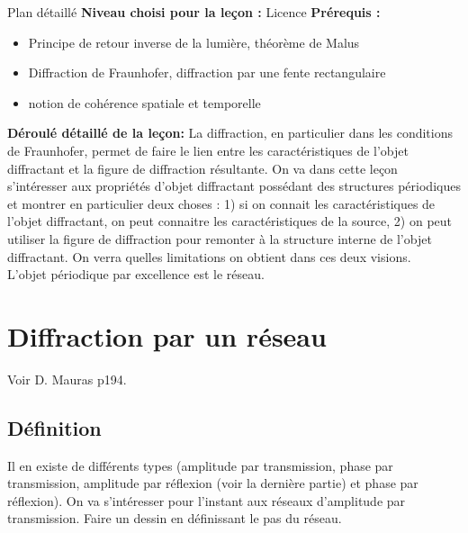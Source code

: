 \begin{reportBlock}{Plan détaillé}
  \textbf{Niveau choisi pour la leçon :} Licence
  \newline
  \textbf{Prérequis : }
  \begin{itemize}
      \item Principe de retour inverse de la lumière, théorème de Malus
      \item Diffraction de Fraunhofer, diffraction par une fente rectangulaire
      \item notion de cohérence spatiale et temporelle
  \end{itemize} 

  
  \textbf{Déroulé détaillé de la leçon: }   \newline
La diffraction, en particulier dans les conditions de  Fraunhofer, permet de faire le lien entre les caractéristiques de l’objet diffractant et la figure de diffraction résultante. On va dans cette leçon s'intéresser aux propriétés d'objet diffractant possédant des structures périodiques et montrer en particulier deux choses : 1) si on connait les caractéristiques de l'objet diffractant, on peut connaitre les caractéristiques de la source, 2) on peut utiliser la figure de diffraction pour remonter à la structure interne de l'objet diffractant. On verra quelles limitations on obtient dans ces deux visions.\\

L'objet périodique par excellence est le réseau.

  \section{Diffraction par un réseau}
  Voir D. Mauras p194.
  \subsection{Définition}
  Il en existe de différents types (amplitude par transmission, phase par transmission, amplitude par réflexion (voir la dernière partie) et phase par réflexion). On va s'intéresser pour l'instant aux réseaux d'amplitude par transmission. Faire un dessin en définissant le pas du réseau.


\end{reportBlock}
